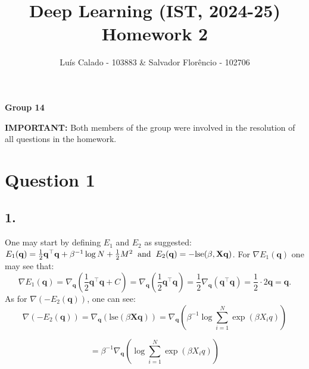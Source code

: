 \documentclass[a4paper, 12pt]{article}
\title{\textbf{Deep Learning (IST, 2024-25) \\ Homework 2}}
\author{Luís Calado - 103883 \& Salvador Florêncio - 102706}
\date{}
\begin{document}
\maketitle
\vspace{-0.8cm}
\begin{center}
    \textbf{Group 14}
\end{center}


\begin{tcolorbox}[colframe=black, colback=white, sharp corners, boxrule=1pt, width=\textwidth]

\textbf{IMPORTANT:} Both members of the group were involved in the resolution of all questions in the homework.
\end{tcolorbox}


\maketitle

\section*{Question 1}

\subsection*{1.}
One may start by defining $E_1$ and $E_2$ as suggested: $E_1(\mathbf{q}) = \frac{1}{2} \mathbf{q}^\top \mathbf{q} + \beta^{-1} \log N + \frac{1}{2} M^2 \hspace{0.2cm}
\text{and} \hspace{0.2cm}
E_2(\mathbf{q}) = -\mathrm{lse}(\beta, \mathbf{X}\mathbf{q})$. For $\nabla E_1(\mathbf{q})$ one may see that:
\[
\nabla E_1(\mathbf{q}) = \nabla_{\mathbf{q}} \left( \frac{1}{2} \mathbf{q}^\top \mathbf{q} + C \right) = \nabla_{\mathbf{q}} \left( \frac{1}{2} \mathbf{q}^\top \mathbf{q} \right) = \frac{1}{2} \nabla_{\mathbf{q}} \left( \mathbf{q}^\top \mathbf{q} \right) 
= \frac{1}{2} \cdot 2 \mathbf{q} = \mathbf{q}. 
\]
As for $\nabla(- E_2(\mathbf{q}))$, one can see: 
\[
\nabla(- E_2(\mathbf{q})) = \nabla_{\mathbf{q}} \left( \text{lse}(\beta \mathbf{X}\mathbf{q})\right) 
= \nabla_{\mathbf{q}} \left( \beta^{-1} \log \sum_{i=1}^N \exp(\beta X_iq) \right) 
\]

\[
=\beta^{-1}\nabla_{\mathbf{q}} \left( \log \sum_{i=1}^N \exp(\beta X_iq) \right) 
\]
\end{document}
